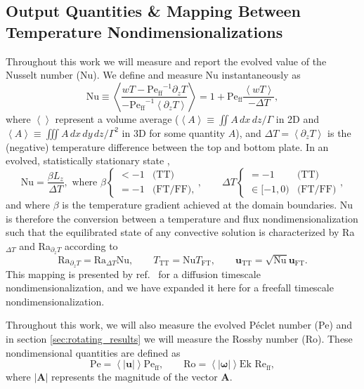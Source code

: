 \documentclass[aps, pre, onecolumn, nofootinbib, notitlepage, groupedaddress, amsfonts, amssymb, amsmath, longbibliography, superscriptaddress]{revtex4-1}
\newcommand{\angles}[1]{\ensuremath{\left\langle #1 \right\rangle}}
\newcommand{\Reff}{\ensuremath{\text{Re}_{\text{ff}}}}
\newcommand{\Peff}{\ensuremath{\text{Pe}_{\text{ff}}}}
\newcommand{\ea}[1]{{\color{red} #1}}
\begin{document}
\ea{
\subsection{Output Quantities \& Mapping Between Temperature Nondimensionalizations}
}
\label{sec:ra_nu_relations}
Throughout this work we will measure and report the evolved value of the Nusselt number (Nu).
We define and measure Nu instantaneously as
\begin{equation}
\text{Nu} \equiv \angles{\frac{w T - \Peff^{-1} \partial_z T}{-\Peff^{-1} \angles{\partial_z T}}}
= 1 + \Peff\frac{\angles{w T}}{-\Delta T},
\end{equation}
where $\angles{}$ represent a volume average ($\angles{A} \equiv \iint A\,dx\,dz / \Gamma$ in 2D and $\angles{A} \equiv \iiint A\,dx\,dy\,dz / \Gamma^2$ in 3D for some quantity $A$), and $\Delta T = \angles{\partial_z T}$ is the (negative) temperature difference between the top and bottom plate.
\ea{In an evolved, statistically stationary state \cite{calkins&all2015}, 
\begin{equation}
\text{Nu} = \frac{\beta L_z}{\Delta T}, \,\,\text{where}\,\,
\beta \begin{cases}
< -1 & \text{(TT)} \\
= -1 & \text{(FT/FF)},
\end{cases},
\qquad
\Delta T \begin{cases}
= -1 & \text{(TT)} \\
\in [-1, 0) & \text{(FT/FF)}
\end{cases},
\label{eqn:evolved_nu}
\end{equation}
and where $\beta$ is the temperature gradient achieved at the domain boundaries.
Nu is therefore the conversion between a temperature and flux nondimensionalization such that the equilibrated state of any convective solution is characterized by Ra$_{\Delta T}$ and Ra$_{\partial_z T}$ according to
\begin{equation}
\text{Ra}_{\partial_z T} = \text{Ra}_{\Delta T} \text{Nu},
\qquad
T_{\text{TT}} = \text{Nu} T_{\text{FT}},
\qquad
\bm{u}_{\text{TT}} = \sqrt{\text{Nu}} \bm{u}_{\text{FT}}.
\label{eqn:ra_relation}
\end{equation}
This mapping is presented by ref.~\cite{calkins&all2015} for a diffusion timescale nondimensionalization, and we have expanded it here for a freefall timescale nondimensionalization.}



Throughout this work, we will also measure the evolved P\'{e}clet number (Pe) and in section \ref{sec:rotating_results} we will measure the Rossby number (Ro).
These nondimensional quantities are defined as
\begin{equation}
\text{Pe} = \angles{|\bm{u}|}\Peff,\qquad \text{Ro} = \angles{|\bm{\omega}|}\text{Ek }\Reff,
\end{equation}
where $|\bm{A}|$ represents the magnitude of the vector $\bm{A}$.
\end{document}
